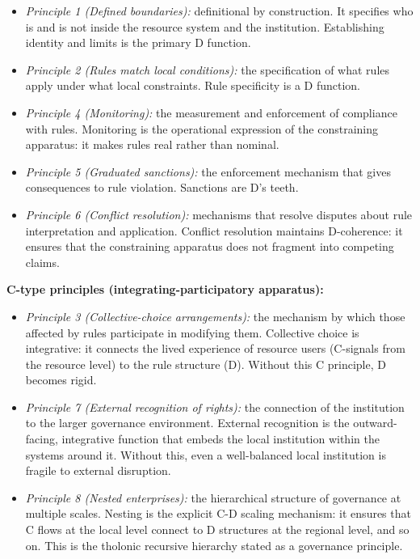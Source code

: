 \documentclass[
  11pt,
  letterpaper,
]{article}
\providecommand{\tightlist}{%
  \setlength{\itemsep}{0pt}\setlength{\parskip}{0pt}}
\begin{document}
\begin{itemize}
\tightlist
\item
  \emph{Principle 1 (Defined boundaries):} definitional by construction.
  It specifies who is and is not inside the resource system and the
  institution. Establishing identity and limits is the primary D
  function.
\item
  \emph{Principle 2 (Rules match local conditions):} the specification
  of what rules apply under what local constraints. Rule specificity is
  a D function.
\item
  \emph{Principle 4 (Monitoring):} the measurement and enforcement of
  compliance with rules. Monitoring is the operational expression of the
  constraining apparatus: it makes rules real rather than nominal.
\item
  \emph{Principle 5 (Graduated sanctions):} the enforcement mechanism
  that gives consequences to rule violation. Sanctions are D's teeth.
\item
  \emph{Principle 6 (Conflict resolution):} mechanisms that resolve
  disputes about rule interpretation and application. Conflict
  resolution maintains D-coherence: it ensures that the constraining
  apparatus does not fragment into competing claims.
\end{itemize}

\textbf{C-type principles (integrating-participatory apparatus):}

\begin{itemize}
\tightlist
\item
  \emph{Principle 3 (Collective-choice arrangements):} the mechanism by
  which those affected by rules participate in modifying them.
  Collective choice is integrative: it connects the lived experience of
  resource users (C-signals from the resource level) to the rule
  structure (D). Without this C principle, D becomes rigid.
\item
  \emph{Principle 7 (External recognition of rights):} the connection of
  the institution to the larger governance environment. External
  recognition is the outward-facing, integrative function that embeds
  the local institution within the systems around it. Without this, even
  a well-balanced local institution is fragile to external disruption.
\item
  \emph{Principle 8 (Nested enterprises):} the hierarchical structure of
  governance at multiple scales. Nesting is the explicit C-D scaling
  mechanism: it ensures that C flows at the local level connect to D
  structures at the regional level, and so on. This is the tholonic
  recursive hierarchy stated as a governance principle.
\end{itemize}
\end{document}
